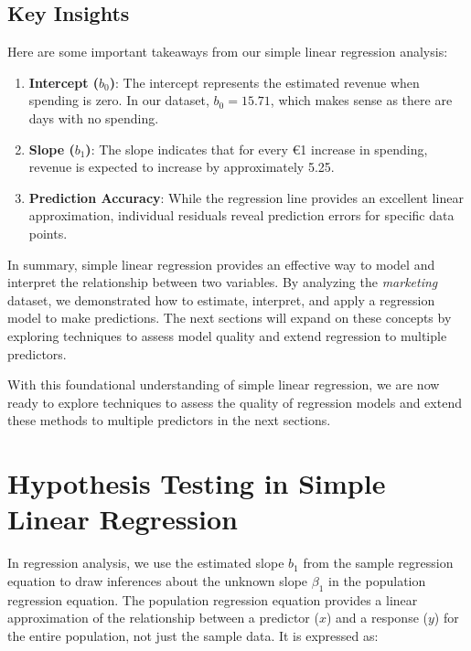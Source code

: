 \documentclass[
]{book}
\providecommand{\tightlist}{%
  \setlength{\itemsep}{0pt}\setlength{\parskip}{0pt}}
\theoremstyle{definition}
\theoremstyle{definition}
\theoremstyle{definition}
\theoremstyle{definition}
\theoremstyle{remark}
\begin{document}
\subsection*{Key Insights}\label{key-insights}

Here are some important takeaways from our simple linear regression analysis:

\begin{enumerate}
\def\labelenumi{\arabic{enumi}.}
\tightlist
\item
  \textbf{Intercept (\(b_0\))}: The intercept represents the estimated revenue when spending is zero. In our dataset, \(b_0 = 15.71\), which makes sense as there are days with no spending.\\
\item
  \textbf{Slope (\(b_1\))}: The slope indicates that for every €1 increase in spending, revenue is expected to increase by approximately 5.25.\\
\item
  \textbf{Prediction Accuracy}: While the regression line provides an excellent linear approximation, individual residuals reveal prediction errors for specific data points.
\end{enumerate}

In summary, simple linear regression provides an effective way to model and interpret the relationship between two variables. By analyzing the \emph{marketing} dataset, we demonstrated how to estimate, interpret, and apply a regression model to make predictions. The next sections will expand on these concepts by exploring techniques to assess model quality and extend regression to multiple predictors.

With this foundational understanding of simple linear regression, we are now ready to explore techniques to assess the quality of regression models and extend these methods to multiple predictors in the next sections.

\section{Hypothesis Testing in Simple Linear Regression}\label{hypothesis-testing-in-simple-linear-regression}

In regression analysis, we use the estimated slope \(b_1\) from the sample regression equation to draw inferences about the unknown slope \(\beta_1\) in the population regression equation. The population regression equation provides a linear approximation of the relationship between a predictor (\(x\)) and a response (\(y\)) for the entire population, not just the sample data. It is expressed as:
\end{document}
